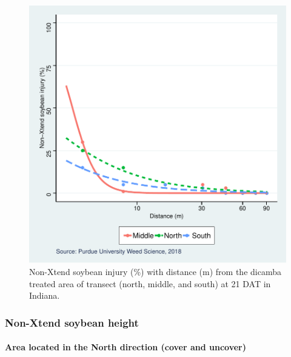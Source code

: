 \documentclass[]{article}
\let\oldparagraph\paragraph
\renewcommand{\paragraph}[1]{\oldparagraph{#1}\mbox{}}
\begin{document}
\begin{figure}
\centering
\includegraphics{Report_files/figure-latex/unnamed-chunk-37-1.pdf}
\caption{Non-Xtend soybean injury (\%) with distance (m) from the
dicamba treated area of transect (north, middle, and south) at 21 DAT in
Indiana.}
\end{figure}

\newpage

\pagebreak

\subsubsection{Non-Xtend soybean
height}\label{non-xtend-soybean-height-2}

\paragraph{\texorpdfstring{Area located in the \textbf{North} direction
(cover and
uncover)}{Area located in the North direction (cover and uncover)}}\label{area-located-in-the-north-direction-cover-and-uncover-1}
\end{document}

